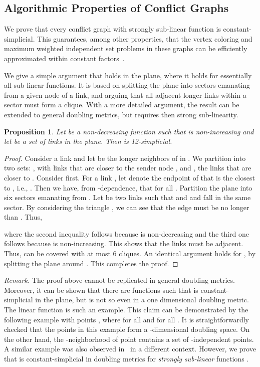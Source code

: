 \documentclass[11pt]{article}
\newcommand{\subsec}[1]{\subsection{#1}}
\newtheorem{proposition}{Proposition}
\begin{document}
\subsec{Algorithmic Properties of Conflict Graphs}

We prove that every conflict graph  with strongly sub-linear function  is constant-simplicial. This guarantees, among other properties, that the vertex coloring and maximum weighted independent set problems in these graphs can be efficiently approximated within constant factors~\cite{ackoglu, kammertholey, yeborodin}. 

We give a simple argument that holds in the plane, where it holds for essentially all sub-linear functions.
It is based on splitting the plane into  sectors emanating from a given node of a link, 
and arguing that all adjacent longer links within a sector must form a clique.
With a more detailed argument, the result can be extended to general doubling metrics, but requires then strong sub-linearity.
\begin{proposition}\label{P:2dperfectness}
Let  be a non-decreasing function such that  is non-increasing and let  be a set of links in the plane. Then  is 12-simplicial.
\end{proposition}

\begin{proof}
  Consider a link  and let  be the longer neighbors of  in . We partition  into two
  sets: , with links that are closer to the sender node , and , the links that are closer to
  . Consider  first. For a link , let  denote the endpoint of  that is the closest to ,
  i.e., . Then we have, from -dependence, that  for all . Partition the plane into six  sectors emanating from . Let  be two links such that
   and  and  fall in the same sector. By considering the triangle , we can see that
  the edge  must be no longer than . Thus,

where the second inequality follows because  is non-decreasing and the third one follows because  is non-increasing. This shows that the links  must be adjacent. Thus,  can be covered with at most 6 cliques. An identical argument holds for , by splitting the plane around . This completes the proof.
\end{proof}

\noindent \emph{Remark.}
The proof above cannot be replicated in general doubling metrics. Moreover, it can be shown that there are functions  such that  is constant-simplicial in the plane, but is not so even in a one dimensional doubling metric. The linear function  is such an example. This claim can be demonstrated by the following example with  points , where  for all  and  for all . It is straightforwardly checked that the points in this example form a -dimensional doubling space. On the other hand, the -neighborhood of point  contains a set of  -independent points. A  similar example was also observed in~\cite{Welzl08} in a different context. However, we prove that  is constant-simplicial in doubling metrics for \emph{strongly sub-linear} functions .
\end{document}
